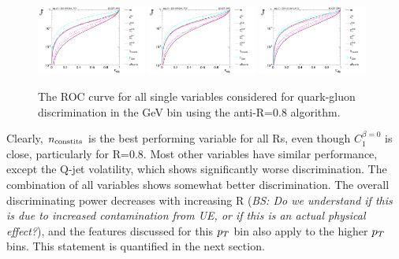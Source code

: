 \begin{figure}
\begin{center}
\includegraphics[width=0.32\textwidth]{./Figures/QGTagging/pT300/AKtR04/Rocs_1D_single.png}
\includegraphics[width=0.32\textwidth]{./Figures/QGTagging/pT300/AKtR08/Rocs_1D_single.png}
\includegraphics[width=0.32\textwidth]{./Figures/QGTagging/pT300/AKtR12/Rocs_1D_single.png}
\caption{The ROC curve for all single variables considered for quark-gluon discrimination in the  GeV bin using the anti-\kT R=0.8 algorithm.}
\label{fig:qg_pt300_single}
\end{center}
\end{figure}
Clearly, $n_{\rm constits}$ is the best performing variable for all Rs, even though $C_1^{\beta=0}$ is close, particularly
for R=0.8. Most other variables have similar performance, except the Q-jet volatility, which shows significantly worse
discrimination. The combination of all variables shows somewhat better discrimination. The overall discriminating 
power decreases with increasing R (\emph{BS: Do we understand if this is due to increased contamination from UE,
or if this is an actual physical effect?}), and the features discussed for this $p_T$ bin also apply to the higher
$p_T$ bins. This statement is quantified in the next section. 


